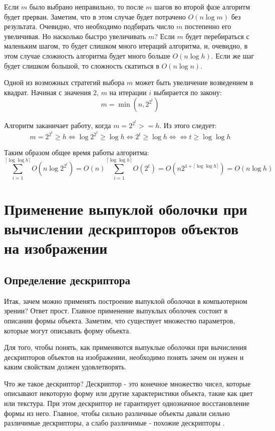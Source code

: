 Если $m$ было выбрано неправильно, то после $m$ шагов во второй фазе алгоритм будет прерван. Заметим, что в этом случае будет потрачено $O(n \log m)$ без результата. Очевидно, что необходимо подбирать число $m$ постепенно его увеличивая. Но насколько быстро увеличивать $m$? Если $m$ будет перебираться с маленьким шагом, то будет слишком много итераций алгоритма, и, очевидно, в этом случае сложность алгоритма будет много больше $O(n \log h)$. Если же шаг будет слишком большой, то сложность скатиться в $O(n \log n)$.

Одной из возможных стратегий выбора $m$ может быть увеличение возведением в квадрат. Начиная с значения $2$, $m$ на итерации $i$ выбирается по закону:
\[
m = \min (n,2^{2^t})
\]

Алгоритм заканичает работу, когда $m = 2^{2^t} >= h$. Из этого следует:
\[
m = 2^{2^t} \geq h \iff \log 2^{2^t} \geq \log h \iff 2^t \geq \log h \iff \iff t \geq \log \log h
\]

Таким образом общее время работы алгоритма:
\[
\sum_{i=1}^{\lceil \log \log h \rceil} O(n \log 2^{2^t}) = O(n) \sum_{i=1}^{\lceil \log \log h \rceil} O(2^t) = O(n 2^{1+\lceil \log \log h \rceil}) = O(n \log h)
\]

\section{Применение выпуклой оболочки при вычислении дескрипторов объектов на изображении}

\subsection{Определение дескриптора}

Итак, зачем можно применять построение выпуклой оболочки в компьютерном зрении? Ответ прост. Главное применение выпуклых оболочек состоит в описании формы объекта. Заметим, что существует множество параметров, которые могут описывать форму объекта.

Для того, чтобы понять, как применяются выпуклые оболочки при вычисления дескрипторов объектов на изображении, необходимо понять зачем он нужен и каким свойствам должен удовлетворять.

Что же такое дескриптор? Дескриптор - это конечное множество чисел, которые описывают некоторую форму или другие характеристики объекта, такие как цвет или текстура. При этом дескриптор не гарантирует однозначное восстановление формы из него. Главное, чтобы сильно различные объекты давали сильно различимые дескрипторы, а слабо различимые - похожие дескрипторы \cite{morse2000lecture}.

